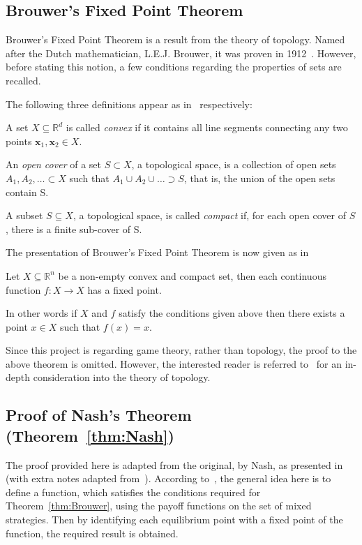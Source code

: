 \subsection{Brouwer's Fixed Point Theorem}\label{subsec:Brouwer_thm}
Brouwer's Fixed Point Theorem is a result from the theory of topology. Named
after the Dutch mathematician, L.E.J. Brouwer, it was proven in
1912~\cite{Carlson2016}. However, before stating this notion, a few conditions
regarding the properties of sets are recalled. 

The following three definitions appear as in~\cite{Weisstein, Barile, Weissteina} respectively:
\begin{definition}
    A set \(X \subseteq \mathbb{R}^{d}\) is called \textit{convex} if it
    contains all line segments connecting any two points \(\textbf{x}_{1},
    \textbf{x}_{2} \in X\).
\end{definition}

\begin{definition}
    An \textit{open cover} of a set \(S \subset X\), a topological space, is a
    collection of open sets \(A_{1}, A_{2}, \ldots \subset X\) such that
    \(A_{1} \cup A_{2} \cup \ldots \supset S\), that is, the union of the open
    sets contain S.
\end{definition}

\begin{definition}
    A subset \(S \subseteq X\), a topological space, is called \textit{compact}
    if, for each open cover of \(S\), there is a finite sub-cover of S.
\end{definition}

The presentation of Brouwer's Fixed Point Theorem is now given as in~\cite{maschler_solan_zamir_2013}
\begin{theorem}\label{thm:Brouwer}
    Let \(X \subseteq \mathbb{R}^{n}\) be a non-empty convex and compact
    set, then each continuous function \(f : X \to X\) has a fixed point.  
\end{theorem}
In other words if \(X\) and \(f\) satisfy the conditions given above then there
exists a point \(x \in X\) such that \(f(x) = x\). 

Since this project is regarding game theory, rather than topology, the proof to
the above theorem is omitted. However, the interested reader is referred
to~\cite{} for an in-depth consideration into the theory of topology.

\subsection{Proof of Nash's Theorem (Theorem~\ref{thm:Nash})}\label{subsec:Nash_Proof}
The proof provided here is adapted from the original, by Nash, as presented
in~\cite{nash1951non} (with extra notes adapted 
from~\cite{maschler_solan_zamir_2013}). According
to~\cite{maschler_solan_zamir_2013}, the general idea here is to define a
function, which satisfies the conditions required for Theorem~\ref{thm:Brouwer},
using the payoff functions on the set of mixed strategies. Then by identifying
each equilibrium point with a fixed point of the function, the required result 
is obtained.

